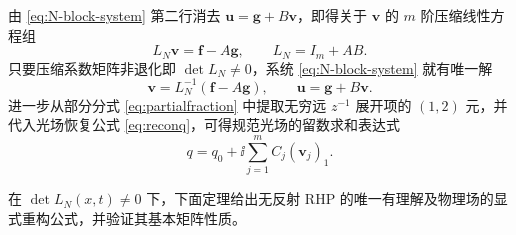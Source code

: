 由 \eqref{eq:N-block-system} 第二行消去 $\boldsymbol u=\boldsymbol g+B\boldsymbol v$，即得关于 $\boldsymbol v$ 的 $m$ 阶压缩线性方程组
\begin{equation*}
L_N\boldsymbol v=\boldsymbol f-A\boldsymbol g,\qquad L_N=I_m+AB.
\end{equation*}
只要压缩系数矩阵非退化即 $\det L_N\ne0$，系统 \eqref{eq:N-block-system} 就有唯一解
\begin{equation}\label{eq:finite-schur}
\boldsymbol v=L_N^{-1}(\boldsymbol f-A\boldsymbol g),\qquad
\boldsymbol u=\boldsymbol g+B\boldsymbol v.
\end{equation}
进一步从部分分式 \eqref{eq:partialfraction} 中提取无穷远 $z^{-1}$ 展开项的 $(1,2)$ 元，并代入光场恢复公式 \eqref{eq:reconq}，可得规范光场的留数求和表达式
\begin{equation}\label{eq:qfinite}
q=q_0+\ii\sum\limits_{j=1}^{m}C_j(\boldsymbol v_j)_1.
\end{equation}

在 $\det L_N(x,t)\ne0$ 下，下面定理给出无反射 RHP 的唯一有理解及物理场的显式重构公式，并验证其基本矩阵性质。

